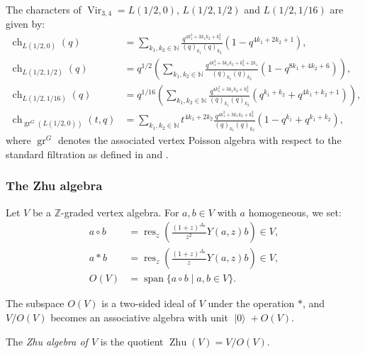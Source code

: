 \documentclass{beamer}
\DeclareMathOperator{\Vir}{Vir}
\DeclareMathOperator{\gr}{gr}
\DeclareMathOperator{\ch}{ch}
\DeclareMathOperator{\vspan}{span}
\DeclareMathOperator{\res}{res}
\DeclareMathOperator{\vac}{|0\rangle}
\DeclareMathOperator{\Zhu}{Zhu}
\begin{document}
\begin{frame}
  \begin{theorem}
    \label{thr:4}
    The characters of $\Vir_{3, 4} = L(1/2, 0)$, $L(1/2, 1/2)$ and $L(1/2, 1/16)$ are given by:
    \footnotesize
    \begin{align*}
      \ch_{L(1/2, 0)}(q) &= \sum_{k_1, k_2 \in \mathbb{N}}\frac{q^{4k_1^2 + 3k_1k_2 + k_2^2}}{(q)_{k_1}(q)_{k_2}}(1 - q^{4k_1 + 2k_2 +1}), \\
      \ch_{L(1/2, 1/2)}(q) &= q^{1/2}\left(\sum_{k_1, k_2 \in \mathbb{N}}\frac{q^{4k_1^2 +3k_1k_2 + k_2^2 + 2k_1}}{(q)_{k_1}(q)_{k_2}}(1 - q^{8k_1 + 4k_2 + 6})\right), \\
      \ch_{L(1/2, 1/16)}(q) &= q^{1/16}\left(\sum_{k_1, k_2 \in \mathbb{N}}\frac{q^{4k_1^2 + 3k_1k_2 + k_2^2}}{(q)_{k_1}(q)_{k_2}}(q^{k_1 + k_2} + q^{4k_1 + k_2 + 1})\right), \\
      \ch_{\gr^G(L(1/2, 0))}(t, q) &= \sum_{k_1, k_2 \in \mathbb{N}}t^{4k_1 + 2k_2}\frac{q^{4k_1^2 + 3k_1k_2 + k_2^2}}{(q)_{k_1}(q)_{k_2}}(1 - q^{k_1} + q^{k_1 + k_2}),
    \end{align*}
    \normalsize
    where $\gr^G$ denotes the associated vertex Poisson algebra with respect to the standard filtration as defined in \cite{li_vertex_2004} and \cite{arakawa_remark_2012}.
  \end{theorem}
\end{frame}

\begin{frame}
  \frametitle{The Zhu algebra}
  Let $V$ be a $\mathbb{Z}$-graded vertex algebra.
  For $a, b \in V$ with $a$ homogeneous, we set:
  \begin{align*}
    a\circ b &= \res_z\left(\frac{(1 + z)^{\Delta_a}}{z^2}Y(a, z)b\right) \in V, \\
    a*b &= \res_z\left(\frac{(1 + z)^{\Delta_a}}{z}Y(a, z)b\right) \in V, \\
    O(V) &= \vspan\{a\circ b \mid a, b \in V\}.
  \end{align*}

  \begin{theorem}
    \label{thr:5}
    The subspace $O(V)$ is a two-sided ideal of $V$ under the operation $*$, and $V/O(V)$ becomes an associative algebra with unit $\vac + O(V)$.
  \end{theorem}

  The \emph{Zhu algebra of $V$} is the quotient $\Zhu(V) = V/O(V)$.
\end{frame}
\end{document}
